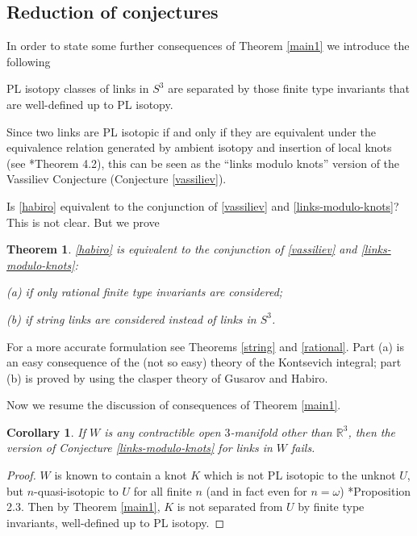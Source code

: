 \documentclass[a4paper,12pt,reqno,oneside]{amsart} %
\theoremstyle{plain}
\newtheorem{mainthm}{Theorem}
\newenvironment{cj}[1]
  {\renewcommand\theinnercj{#1}\innercj}
  {\endinnercj}
\newtheorem{corollary}[theorem]{Corollary}
\theoremstyle{definition}
\theoremstyle{named}
\renewcommand{\:}{\colon}
\def\R{\mathbb{R}}
\begin{document}
\subsection{Reduction of conjectures}
In order to state some further consequences of Theorem \ref{main1} we introduce the following

\begin{cj}{(L/K)} \label{links-modulo-knots} PL isotopy classes of links in $S^3$ are separated by those finite type invariants 
that are well-defined up to PL isotopy.
\end{cj}

Since two links are PL isotopic if and only if they are equivalent under the equivalence relation generated by ambient isotopy 
and insertion of local knots (see \cite{Ro2}*{Theorem 4.2}), this can be seen as the ``links modulo knots'' version of 
the Vassiliev Conjecture (Conjecture \ref{vassiliev}).

Is \ref{habiro} equivalent to the conjunction of \ref{vassiliev} and \ref{links-modulo-knots}?
This is not clear. 
But we prove

\begin{mainthm} \label{string+rational}
\ref{habiro} is equivalent to the conjunction of \ref{vassiliev} and \ref{links-modulo-knots}:

(a) if only rational finite type invariants are considered;

(b) if string links are considered instead of links in $S^3$.
\end{mainthm}

For a more accurate formulation see Theorems \ref{string} and \ref{rational}.
Part (a) is an easy consequence of the (not so easy) theory of the Kontsevich integral; part (b) is proved by using the clasper theory 
of Gusarov and Habiro.

Now we resume the discussion of consequences of Theorem \ref{main1}.

\begin{corollary} If $W$ is any contractible open $3$-manifold other than $\R^3$, then the version of
Conjecture \ref{links-modulo-knots} for links in $W$ fails.
\end{corollary}

\begin{proof} $W$ is known to contain a knot $K$ which is not PL isotopic to the unknot $U$, but $n$-quasi-isotopic to $U$ for all finite $n$ 
(and in fact even for $n=\omega$) \cite{MR2}*{Proposition 2.3}.
Then by Theorem \ref{main1}, $K$ is not separated from $U$ by finite type invariants, well-defined up to PL isotopy.
\end{proof}
\end{document}
